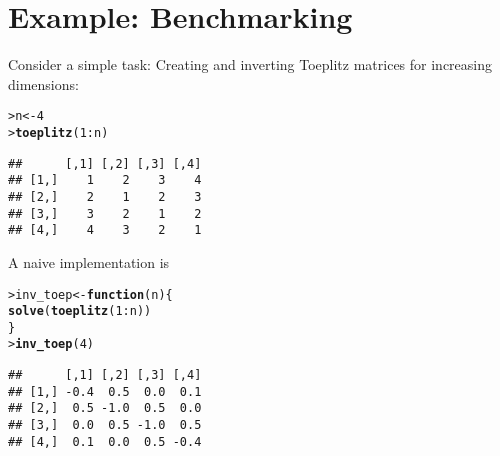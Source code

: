\documentclass[11pt]{article}\usepackage[]{graphicx}\usepackage[]{xcolor}
\makeatletter
\newcommand{\hlnum}[1]{\textcolor[rgb]{0.686,0.059,0.569}{#1}}%
\newcommand{\hlopt}[1]{\textcolor[rgb]{0,0,0}{#1}}%
\newcommand{\hlstd}[1]{\textcolor[rgb]{0.345,0.345,0.345}{#1}}%
\newcommand{\hlkwa}[1]{\textcolor[rgb]{0.161,0.373,0.58}{\textbf{#1}}}%
\newcommand{\hlkwb}[1]{\textcolor[rgb]{0.69,0.353,0.396}{#1}}%
\newcommand{\hlkwc}[1]{\textcolor[rgb]{0.333,0.667,0.333}{#1}}%
\newcommand{\hlkwd}[1]{\textcolor[rgb]{0.737,0.353,0.396}{\textbf{#1}}}%
\newenvironment{kframe}{%
 \def\at@end@of@kframe{}%
 \ifinner\ifhmode%
  \def\at@end@of@kframe{\end{minipage}}%
  \begin{minipage}{\columnwidth}%
 \fi\fi%
 \def\FrameCommand##1{\hskip\@totalleftmargin \hskip-\fboxsep
 \colorbox{shadecolor}{##1}\hskip-\fboxsep
     \hskip-\linewidth \hskip-\@totalleftmargin \hskip\columnwidth}%
 \MakeFramed {\advance\hsize-\width
   \@totalleftmargin\z@ \linewidth\hsize
   \@setminipage}}%
 {\par\unskip\endMakeFramed%
 \at@end@of@kframe}
\newenvironment{knitrout}{}{} %
\makeatother
\begin{document}
\section{Example: Benchmarking}
\label{sec:exampl-benchm}


Consider a simple task: Creating and inverting Toeplitz matrices for increasing dimensions: 

\begin{knitrout}
\color{fgcolor}\begin{kframe}
\begin{alltt}
\hlstd{> }\hlstd{n} \hlkwb{<-} \hlnum{4}
\hlstd{> }\hlkwd{toeplitz}\hlstd{(}\hlnum{1}\hlopt{:}\hlstd{n)}
\end{alltt}
\begin{verbatim}
##      [,1] [,2] [,3] [,4]
## [1,]    1    2    3    4
## [2,]    2    1    2    3
## [3,]    3    2    1    2
## [4,]    4    3    2    1
\end{verbatim}
\end{kframe}
\end{knitrout}

A naive implementation is
\begin{knitrout}
\color{fgcolor}\begin{kframe}
\begin{alltt}
\hlstd{> }\hlstd{inv_toep} \hlkwb{<-} \hlkwa{function}\hlstd{(}\hlkwc{n}\hlstd{) \{}
\hlstd{  }    \hlkwd{solve}\hlstd{(}\hlkwd{toeplitz}\hlstd{(}\hlnum{1}\hlopt{:}\hlstd{n))}
\hlstd{  }\hlstd{\}}
\hlstd{> }\hlkwd{inv_toep}\hlstd{(}\hlnum{4}\hlstd{)}
\end{alltt}
\begin{verbatim}
##      [,1] [,2] [,3] [,4]
## [1,] -0.4  0.5  0.0  0.1
## [2,]  0.5 -1.0  0.5  0.0
## [3,]  0.0  0.5 -1.0  0.5
## [4,]  0.1  0.0  0.5 -0.4
\end{verbatim}
\end{kframe}
\end{knitrout}
\end{document}
